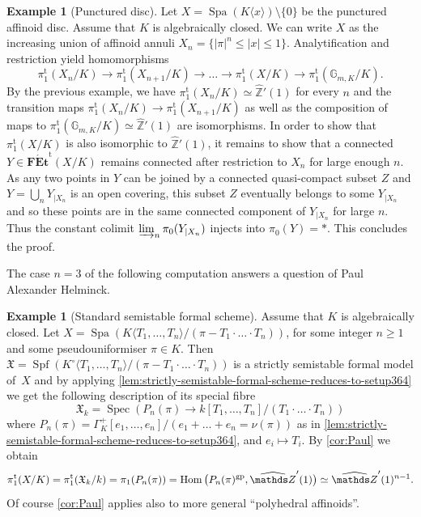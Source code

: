 \documentclass[a4paper,twoside,11pt,reqno]{amsart}
\renewcommand{\mathbb}{\mathds}
\newcommand{\bZ}{{\mathbb Z}}
\newcommand{\fX}{{\mathfrak{X}}}
\newcommand{\la}{\longrightarrow}
\DeclareMathOperator{\Hom}{Hom}
\DeclareMathOperator{\Spec}{Spec}
\DeclareMathOperator{\Spf}{Spf}
\DeclareMathOperator{\Spa}{Spa}
\newcommand{\gp}{{\rm gp}}
\newcommand{\cat}[1]{\mathbf{#1}}
\newcommand{\pitame}{\pi_1^{\mathrm{t}}}
\newcommand{\FEtt}{{\cat{F\acute{E}t}}^{\!\mathrm{t}}}
\theoremstyle{definition}
\newtheorem{ex}[thm]{Example}
\numberwithin{equation}{subsection}
\begin{document}
\begin{ex}[Punctured disc]
   Let $X = \Spa(K\langle x\rangle)\setminus\{0\}$ be the punctured affinoid disc.  Assume that $K$ is algebraically closed. 
   We can write $X$ as the increasing union of affinoid annuli $X_n = \{|\pi|^n\leq |x|\leq 1\}$. 
   Analytification and restriction yield homomorphisms
   \[
   \pitame(X_n/K) \la \pitame(X_{n+1}/K) \la \ldots \la \pitame(X/K) \la \pitame(\mathbb{G}_{m,K}/K).
   \]
   By the previous example, we have $\pitame(X_n/K) \simeq \widehat{\mathbb{Z}}'(1)$ for every $n$ and the transition maps $\pitame(X_n/K)\to \pitame(X_{n+1}/K)$ as well as the composition of maps to $\pitame(\mathbb{G}_{m,K}/K) \simeq \widehat{\mathbb{Z}}'(1)$ are isomorphisms. In order to show that $\pitame(X/K)$ is also isomorphic to $\widehat{\mathbb{Z}}'(1)$, it remains to show that a connected $Y \in \FEtt(X/K)$ remains connected after restriction to $X_n$ for large enough $n$. As any two points in $Y$ can be joined by a connected quasi-compact subset $Z$ and $Y = \bigcup_n Y_{|X_n}$  is an open covering, this subset $Z$ eventually belongs to some $Y_{|X_n}$ and so these points are in the same connected component of $Y_{|X_n}$ for large $n$. Thus the constant colimit $\varinjlim_n \pi_0(Y_{|X_n})$ injects into $\pi_0(Y) = *$. This concludes the proof. 
\end{ex}

The case $n=3$ of the following computation answers a question of Paul Alexander Helminck.

\begin{ex}[Standard semistable formal scheme] \label{ex:helminck}
    Assume that $K$ is algebraically closed. 
    Let $X = \Spa(K\langle T_1,\ldots,T_n\rangle/(\pi - T_1 \cdot \ldots \cdot T_n))$, for some integer $n \geq 1$ and some pseudouniformiser $\pi \in K$. 
    Then $\fX = \Spf(K^\circ\langle T_1, \ldots, T_n\rangle/(\pi - T_1 \cdot \ldots \cdot T_n))$ is a strictly semistable formal model of~$X$ and by applying 
    \cref{lem:strictly-semistable-formal-scheme-reduces-to-setup364}
    we get the following description of its special fibre 
    \[
        \fX_k = \Spec\left(P_{n}(\pi) \to k[T_1, \ldots,T_n]/(T_1 \cdot \ldots \cdot T_n)\right)
    \]   
    where $P_{n}(\pi) = \Gamma_K^+[e_1, \ldots, e_n]/(e_1 + \ldots + e_n = \nu(\pi))$ as in \cref{lem:strictly-semistable-formal-scheme-reduces-to-setup364}, and $e_i \mapsto T_i$.
    By \cref{cor:Paul} we obtain
    \[
        \pitame(X/K)  = \pitame(\fX_k/k) = \pi_1(P_{n}(\pi))
        = \Hom\big(P_{n}(\pi)^\gp, \widehat{\bZ}'(1)\big) 
        \simeq \widehat{\bZ}'(1)^{n-1}.
    \]    
    Of course \cref{cor:Paul} applies also to more general ``polyhedral affinoids''.
\end{ex}







\printbibliography
\end{document}

